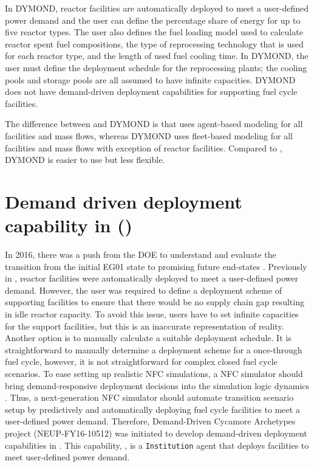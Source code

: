 In DYMOND, reactor facilities are automatically deployed to 
meet a user-defined power demand and the user can define 
the percentage share of energy for up to five reactor types. 
The user also defines the fuel loading model used to calculate 
reactor spent fuel compositions, the type of reprocessing 
technology that is used for each reactor type, and the length 
of used fuel cooling time. 
In DYMOND, the user must define the deployment schedule for 
the reprocessing plants; the cooling pools and storage pools 
are all assumed to have infinite capacities. 
DYMOND does not have demand-driven deployment capabilities for 
supporting fuel cycle facilities. 

The difference between \Cyclus and DYMOND is that \Cyclus uses 
agent-based modeling for all facilities and mass flows, 
whereas DYMOND uses fleet-based modeling for all facilities and 
mass flows with exception of reactor facilities. 
Compared to \Cyclus, DYMOND is easier to use but less flexible. 

\section{Demand driven deployment capability in \Cyclus (\deploy)}
In 2016, there was a push from the DOE to understand and evaluate the 
transition from the initial EG01 state to promising future 
end-states \cite{feng_standardized_2016}.
Previously in \Cyclus, reactor facilities were automatically 
deployed to meet a user-defined power demand. 
However, the user was required to define a deployment scheme of 
supporting facilities to ensure that there would be no supply chain 
gap resulting in idle reactor capacity. 
To avoid this issue, users 
have to set infinite capacities for the support facilities, 
but this is an inaccurate representation of reality. 
Another option is to manually calculate a suitable deployment 
schedule. 
It is straightforward to manually determine a deployment scheme 
for a once-through fuel cycle, however, it is not straightforward
for complex closed fuel cycle scenarios.  
To ease setting up realistic \gls{NFC} simulations, a \gls{NFC} simulator
should bring demand-responsive deployment decisions into 
the simulation logic dynamics \cite{huff_current_2017}. 
Thus, a next-generation \gls{NFC} simulator should automate 
transition scenario setup by predictively and 
automatically deploying fuel cycle facilities to meet a user-defined 
power demand. 
Therefore, Demand-Driven Cycamore Archetypes project
(NEUP-FY16-10512) was initiated to develop demand-driven deployment 
capabilities in \Cyclus.
This capability, \deploy, is a \Cyclus \texttt{Institution}
agent that deploys facilities to meet user-defined power demand. 

